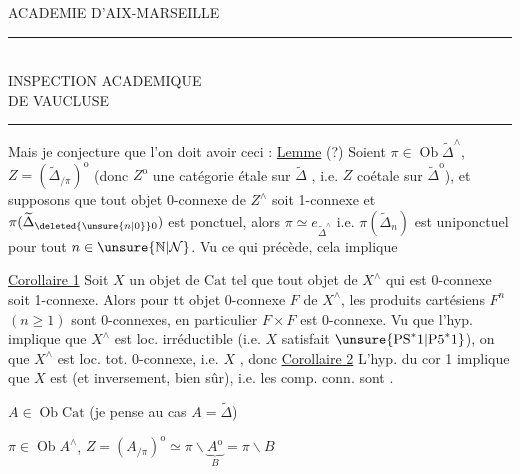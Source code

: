 \begin{center}
ACADEMIE D'AIX-MARSEILLE\\
\rule{4em}{0.4pt}\\
INSPECTION ACADEMIQUE\\
DE VAUCLUSE\\
\rule{1.6em}{0.4pt}
\end{center}
Mais je conjecture que l'on doit avoir ceci :
\uline{Lemme} (?) Soient $\pi\in\operatorname{Ob}\widetilde\Delta^\wedge$, $Z=(\widetilde\Delta_{/\pi})^{\mathrm o}$ (donc $Z^{\mathrm o}$ une catégorie étale sur $\widetilde\Delta$ , i.e. $Z$ coétale sur $\widetilde\Delta^{\mathrm o}$), et supposons que  tout objet 0-connexe de $Z^\wedge$ soit 1-connexe et  $\pi(\widetilde\Delta_{\deleted{\unsure{n|0}}0})$ est ponctuel, alors $\pi\simeq e_{\widetilde\Delta^\wedge}$ i.e. $\pi(\widetilde\Delta_n)$ est uniponctuel pour tout $n\in\unsure{\mathbb N|\mathcal N}$.
Vu ce qui précède, cela implique

\uline{Corollaire 1} Soit $X$ un objet de $\mathrm{Cat}$ tel que tout objet de $X^\wedge$ qui est 0-connexe soit 1-connexe. Alors  pour tt objet 0-connexe $F$ de $X^\wedge$, les produits cartésiens $F^n$ $(n\geq1)$ sont 0-connexes, en particulier $F\times F$ est 0-connexe.
Vu  que  l'hyp. implique que $X^\wedge$ est loc. irréductible (i.e. $X$ satisfait $\unsure{\mathrm{PS}^*1|\mathrm{P5}^*1}$), on  que $X^\wedge$ est loc. tot. 0-connexe, i.e. $X$  , donc
\uline{Corollaire 2} L'hyp. du cor 1 implique que $X$ est   (et inversement, bien sûr), i.e. les comp. conn. sont .

$A\in\operatorname{Ob}\mathrm{Cat}$ (je pense au cas $A=\widetilde\Delta$)

$\pi\in\operatorname{Ob}A^\wedge$, $Z=(A_{/\pi})^{\mathrm o}\simeq\pi\backslash\underbrace{A^{\mathrm o}}_B=\pi\backslash B$

